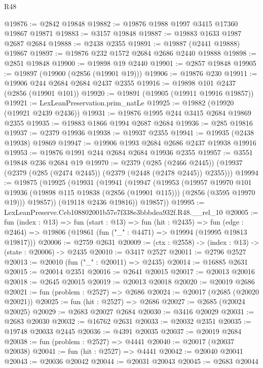\begin{lexlean}{R48}
\begin{coremodule}
@19876 := @2842 @19848
@19882 := @19876 @1988 @1997 @3415 @17360 @19867 @19871
@19883 := @3157 @19848
@19887 := @19883 @1633 @1987 @2687 @2684
@19888 := @2438 @2355
@19891 := @19887 (@2441 @19888) @19867
@19897 := @19876 @232 @1572 @2684 @2686 @2440 @19888
@19898 := @2851 @19848
@19900 := @19898 @19 @2440
@19901 := @2857 @19848
@19905 := @19897 (@19900 (@2856 (@19901 @19)))
@19906 := @19876 @230
@19911 := @19906 @244 @2684 @2684 @2437 @2355
@19916 := @19898 @101 @2437 (@2856 (@19901 @101))
@19920 := @19891 (@19905 (@19911 @19916 @19857))
@19921 := LexLeanPreservation.prim_natLe
@19925 := @19882 (@19920 (@19921 @2439 @2436))
@19931 := @19876 @1995 @244 @3415 @2684 @19869 @2355
@19935 := @19883 @1866 @1994 @2687 @2684
@19936 := @285 @19816
@19937 := @2379 @19936
@19938 := @19937 @2355
@19941 := @19935 (@2438 @19938) @19869
@19947 := @19906 @1993 @2684 @2686 @2437 @19938 @19916
@19953 := @19876 @1991 @244 @2684 @2684 @19936 @2355
@19957 := @3551 @19848 @236 @2684 @19
@19970 := @2379
    (@285 (@2466 @2445))
    (@19937 (@2379 (@285 (@2474 @2445)) (@2379 (@2448 (@2478 @2445)) @2355)))
@19994 := @19875
    (@19925
      (@19931
        (@19941
          (@19947
            (@19953
              (@19957
                @19970
                @101
                @19936
                (@19898 @115 @19838 (@2856 (@19901 @115)))
                (@2856 (@3595 @19970 @19)))
              @19857))
          (@19118 @2436 @19816))
        @19857))
@19995 := LexLeanPreserve.Ceb108802001b57e7f338e3bbbdea932f.R48.__rel_10
@20005 := fun (index : @13) =>
  fun (start : @13) =>
  fun (hit : @2435) =>
  fun (edge : @2464) => @19806 (@19861 (fun ("_" : @4471) => @19994 (@19995 @19813 @19817)))
@20006 := @2759 @2631
@20009 := (ctx : @2558) -> (index : @13) -> (state : @20006) -> @2435
@20010 := @3417 @2527
@20011 := @2796 @2527
@20013 := @20010 (fun ("_" : @20011) => @2435)
@20014 := @16885 @2631
@20015 := @20014 @2351
@20016 := @2641 @20015
@20017 := @20013 @20016
@20018 := @2645 @20015
@20019 := @20013 @20018
@20020 := @20019 @2686
@20021 := fun (problem : @2527) => @2686
@20024 := @20017 (@2685 (@20020 @20021))
@20025 := fun (hit : @2527) => @2686
@20027 := @2685 (@20024 @20025)
@20029 := @2683 @20027 @2684
@20030 := @3416 @20029
@20031 := @2683 @20030
@20032 := @16762 @2631
@20033 := @20032 @2351
@20035 := @19748 @20033 @2445
@20036 := @4391 @20035
@20037 := @20019 @2684
@20038 := fun (problem : @2527) => @4441
@20040 := @20017 (@20037 @20038)
@20041 := fun (hit : @2527) => @4441
@20042 := @20040 @20041
@20043 := @20036 @20042
@20044 := @20031 @20043
@20045 := @2683 @20044

\end{coremodule}
\end{lexlean}
